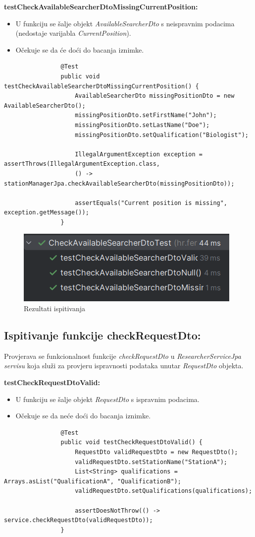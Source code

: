 			\textbf{testCheckAvailableSearcherDtoMissingCurrentPosition:}
			\begin{itemize}
				\item U funkciju se šalje objekt \textit{AvailableSearcherDto} s neispravnim podacima (nedostaje varijabla \textit{CurrentPosition}).
				\item Očekuje se da će doći do bacanja iznimke.
			\end{itemize}
			\begin{lstlisting}
				@Test
				public void testCheckAvailableSearcherDtoMissingCurrentPosition() {
					AvailableSearcherDto missingPositionDto = new AvailableSearcherDto();
					missingPositionDto.setFirstName("John");
					missingPositionDto.setLastName("Doe");
					missingPositionDto.setQualification("Biologist");
					
					IllegalArgumentException exception = assertThrows(IllegalArgumentException.class,
					() -> stationManagerJpa.checkAvailableSearcherDto(missingPositionDto));
					
					assertEquals("Current position is missing", exception.getMessage());
				}
			\end{lstlisting}
			
			\begin{figure}[H]
				\includegraphics[scale=1]{slike/checkAvailableSearchersDtoTest.png} 
				\centering
				\caption{Rezultati ispitivanja}
				\label{fig:checkAvailableSearchersDtoTest}
			\end{figure}
			
			\subsection{Ispitivanje funkcije checkRequestDto:}
			Provjerava se funkcionalnost funkcije \textit{checkRequestDto} u \textit{ResearcherServiceJpa servisu} koja služi za provjeru ispravnosti podataka unutar \textit{RequestDto} objekta.
			
			\textbf{testCheckRequestDtoValid:}
			\begin{itemize}
				\item U funkciju se šalje objekt \textit{RequestDto} s ispravnim podacima.
				\item Očekuje se da neće doći do bacanja iznimke.
			\end{itemize}
			\begin{lstlisting}
				@Test
				public void testCheckRequestDtoValid() {
					RequestDto validRequestDto = new RequestDto();
					validRequestDto.setStationName("StationA");
					List<String> qualifications = Arrays.asList("QualificationA", "QualificationB");
					validRequestDto.setQualifications(qualifications);
					
					assertDoesNotThrow(() -> service.checkRequestDto(validRequestDto));
				}
			\end{lstlisting}
			
